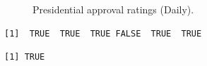 \documentclass[
  letterpaper,
  DIV=11,
  numbers=noendperiod]{scrartcl}
\begin{document}
\begin{figure}[H]


\caption{\label{fig-approval}Presidential approval ratings (Daily).}

\end{figure}%

\begin{verbatim}
[1]  TRUE  TRUE  TRUE FALSE  TRUE  TRUE
\end{verbatim}

\begin{verbatim}
[1] TRUE
\end{verbatim}
\end{document}
